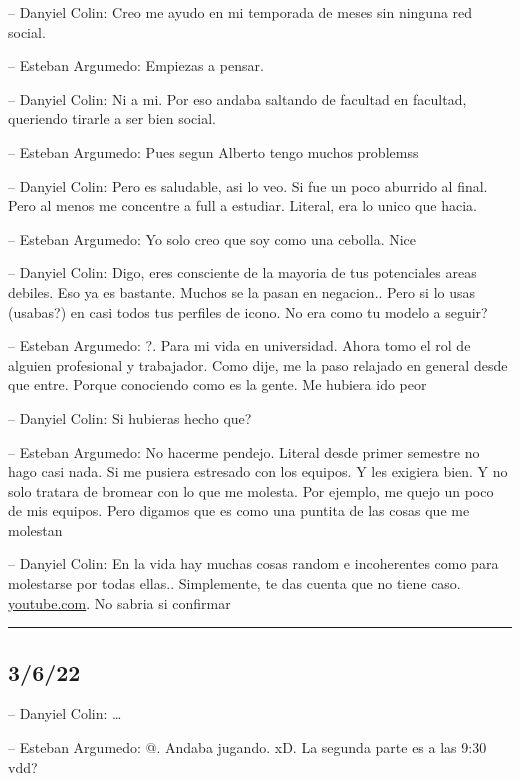 -- Danyiel Colin: Creo me ayudo en mi temporada de meses sin ninguna red
social.

-- Esteban Argumedo: Empiezas a pensar.

-- Danyiel Colin: Ni a mi. Por eso andaba saltando de facultad en
facultad, queriendo tirarle a ser bien social.

-- Esteban Argumedo: Pues segun Alberto tengo muchos problemss

-- Danyiel Colin: Pero es saludable, asi lo veo. Si fue un poco aburrido
al final. Pero al menos me concentre a full a estudiar. Literal, era lo
unico que hacia.

-- Esteban Argumedo: Yo solo creo que soy como una cebolla. Nice

-- Danyiel Colin: Digo, eres consciente de la mayoria de tus potenciales
areas debiles. Eso ya es bastante. Muchos se la pasan en negacion.. Pero
si lo usas (usabas?) en casi todos tus perfiles de icono. No era como tu
modelo a seguir?

-- Esteban Argumedo: ?. Para mi vida en universidad. Ahora tomo el rol
de alguien profesional y trabajador. Como dije, me la paso relajado en
general desde que entre. Porque conociendo como es la gente. Me hubiera
ido peor

-- Danyiel Colin: Si hubieras hecho que?

-- Esteban Argumedo: No hacerme pendejo. Literal desde primer semestre
no hago casi nada. Si me pusiera estresado con los equipos. Y les
exigiera bien. Y no solo tratara de bromear con lo que me molesta. Por
ejemplo, me quejo un poco de mis equipos. Pero digamos que es como una
puntita de las cosas que me molestan

-- Danyiel Colin: En la vida hay muchas cosas random e incoherentes como
para molestarse por todas ellas.. Simplemente, te das cuenta que no
tiene caso.
\href{https://youtube.com/shorts/vxzSc0qlc8A?feature=share}{youtube.com}.
No sabria si confirmar

\begin{center}\rule{0.5\linewidth}{0.5pt}\end{center}

\hypertarget{section-25}{%
\subsection{3/6/22}\label{section-25}}

-- Danyiel Colin: \ldots{}

-- Esteban Argumedo: @. Andaba jugando. xD. La segunda parte es a las
9:30 vdd?

